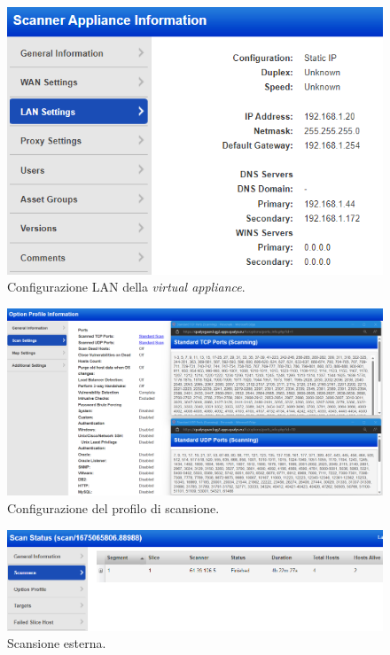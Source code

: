 \documentclass[target=bach,aauheader=]{thud}
\begin{document}
\pagebreak

\begin{figure}[h]
\centering
    \includegraphics[scale=0.7]{images/qualys_appliance2.png}
    \caption{Configurazione LAN della \textit{virtual appliance}.}
    \label{fig:qualys_appliance}
\end{figure}

\begin{figure}[!]
\centering
    \includegraphics[scale=0.35]{images/qualys_scan-profile.png}
    \caption{Configurazione del profilo di scansione.}
    \label{fig:qualys_scan-profile}
\end{figure}

\begin{figure}[!]
\centering
    \includegraphics[scale=0.6]{images/qualys_scan_ext.png}
    \caption{Scansione esterna.}
    \label{fig:qualys_scan_ext}
\end{figure}
\end{document}
